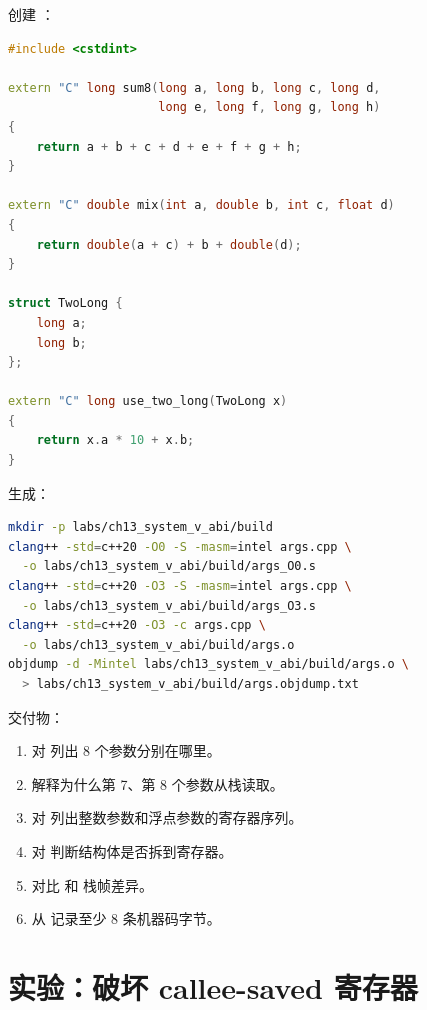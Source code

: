 \begin{labbox}
创建 ：

\begin{lstlisting}[language=C++]
#include <cstdint>

extern "C" long sum8(long a, long b, long c, long d,
                     long e, long f, long g, long h)
{
    return a + b + c + d + e + f + g + h;
}

extern "C" double mix(int a, double b, int c, float d)
{
    return double(a + c) + b + double(d);
}

struct TwoLong {
    long a;
    long b;
};

extern "C" long use_two_long(TwoLong x)
{
    return x.a * 10 + x.b;
}
\end{lstlisting}

生成：

\begin{lstlisting}[language=bash]
mkdir -p labs/ch13_system_v_abi/build
clang++ -std=c++20 -O0 -S -masm=intel args.cpp \
  -o labs/ch13_system_v_abi/build/args_O0.s
clang++ -std=c++20 -O3 -S -masm=intel args.cpp \
  -o labs/ch13_system_v_abi/build/args_O3.s
clang++ -std=c++20 -O3 -c args.cpp \
  -o labs/ch13_system_v_abi/build/args.o
objdump -d -Mintel labs/ch13_system_v_abi/build/args.o \
  > labs/ch13_system_v_abi/build/args.objdump.txt
\end{lstlisting}

交付物：

\begin{enumerate}
  \item 对  列出 8 个参数分别在哪里。
  \item 解释为什么第 7、第 8 个参数从栈读取。
  \item 对  列出整数参数和浮点参数的寄存器序列。
  \item 对  判断结构体是否拆到寄存器。
  \item 对比 \code{-O0} 和 \code{-O3} 栈帧差异。
  \item 从 \code{objdump} 记录至少 8 条机器码字节。
\end{enumerate}
\end{labbox}

\section{实验：破坏 callee-saved 寄存器}

